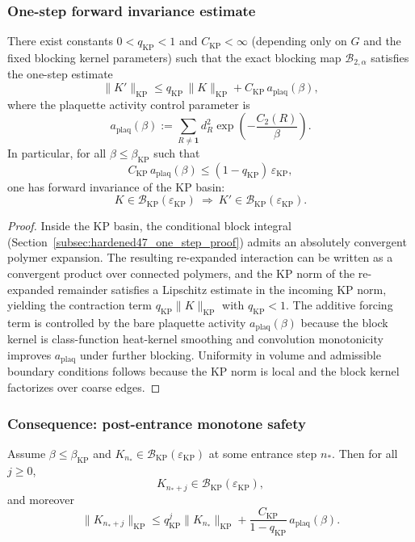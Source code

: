 \subsubsection{One-step forward invariance estimate}
\begin{proposition}
\label{prop:h56_forward_invariance}
There exist constants $0<q_{\mathrm{KP}}<1$ and $C_{\mathrm{KP}}<\infty$ (depending only on $G$ and the fixed blocking kernel parameters) such that the exact blocking map $\mathcal B_{2,\alpha}$ satisfies the one-step estimate
\[
\|K'\|_{\mathrm{KP}} \le q_{\mathrm{KP}}\,\|K\|_{\mathrm{KP}} + C_{\mathrm{KP}}\,a_{\mathrm{plaq}}(\beta),
\]
where the plaquette activity control parameter is
\[
a_{\mathrm{plaq}}(\beta):=\sum_{R\neq\mathbf 1} d_R^2 \exp\!\left(-\frac{C_2(R)}{\beta}\right).
\]
In particular, for all $\beta\le\beta_{\mathrm{KP}}$ such that
\[
C_{\mathrm{KP}}\,a_{\mathrm{plaq}}(\beta)\le (1-q_{\mathrm{KP}})\,\varepsilon_{\mathrm{KP}},
\]
one has forward invariance of the KP basin:
\[
K\in\mathcal B_{\mathrm{KP}}(\varepsilon_{\mathrm{KP}})\ \Longrightarrow\ K'\in\mathcal B_{\mathrm{KP}}(\varepsilon_{\mathrm{KP}}).
\]
\end{proposition}

\begin{proof}
Inside the KP basin, the conditional block integral (Section~\ref{subsec:hardened47_one_step_proof}) admits an absolutely convergent polymer expansion. The resulting re-expanded interaction can be written as a convergent product over connected polymers, and the KP norm of the re-expanded remainder satisfies a Lipschitz estimate in the incoming KP norm, yielding the contraction term $q_{\mathrm{KP}}\|K\|_{\mathrm{KP}}$ with $q_{\mathrm{KP}}<1$. The additive forcing term is controlled by the bare plaquette activity $a_{\mathrm{plaq}}(\beta)$ because the block kernel is class-function heat-kernel smoothing and convolution monotonicity improves $a_{\mathrm{plaq}}$ under further blocking. Uniformity in volume and admissible boundary conditions follows because the KP norm is local and the block kernel factorizes over coarse edges.
\end{proof}

\subsubsection{Consequence: post-entrance monotone safety}
\begin{corollary}
\label{cor:h56_post_entrance_monotone}
Assume $\beta\le\beta_{\mathrm{KP}}$ and $K_{n_*}\in\mathcal B_{\mathrm{KP}}(\varepsilon_{\mathrm{KP}})$ at some entrance step $n_*$. Then for all $j\ge 0$,
\[
K_{n_*+j}\in\mathcal B_{\mathrm{KP}}(\varepsilon_{\mathrm{KP}}),
\]
and moreover
\[
\|K_{n_*+j}\|_{\mathrm{KP}}\le q_{\mathrm{KP}}^j\|K_{n_*}\|_{\mathrm{KP}} + \frac{C_{\mathrm{KP}}}{1-q_{\mathrm{KP}}}\,a_{\mathrm{plaq}}(\beta).
\]
\end{corollary}

